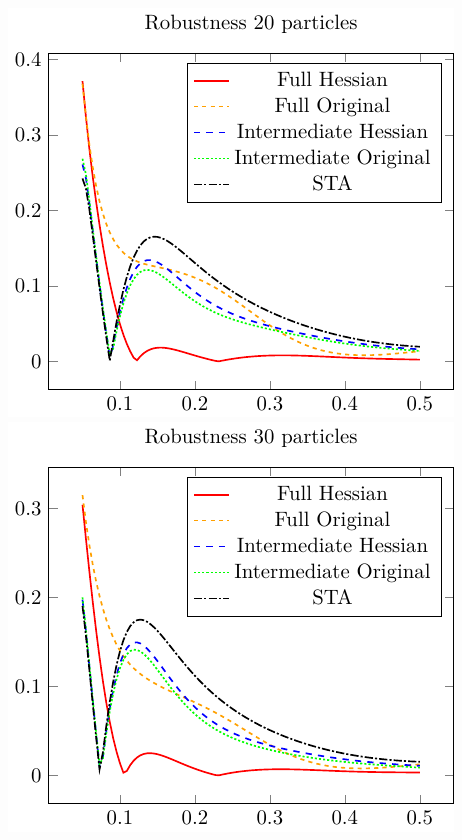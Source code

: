 
\includegraphics{./gfx/robustness_np20_nlambda5.pdf}
\includegraphics{./gfx/robustness_np30_nlambda5.pdf}

